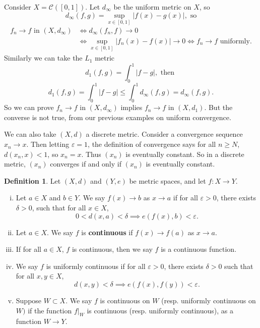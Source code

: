 \documentclass[12pt]{article}
\theoremstyle{definition}
\newtheorem{definition}{Definition}[section]
\theoremstyle{remark}
\begin{document}
\begin{adjustbox}{minipage = \columnwidth - 25.5pt, margin=1em, frame=1pt, margin=0em}
	Consider $X = \mathcal{C}([0, 1])$. Let $d_{\infty}$ be the uniform metric on $X$, so
	\[
		d_{\infty}(f, g) = \sup_{x\in[0,1]}|f(x) - g(x)|, \text{ so}
	\]
	\begin{align*}
		f_n \to f \text{ in } (X, d_{\infty}) &\iff d_{\infty}(f_n, f) \to 0 \\
						      &\iff \sup_{x \in [0, 1]}|f_n(x) - f(x)| \to 0 \iff f_n \to f \text{ uniformly}.
	\end{align*}
	Similarly we can take the $L_1$ metric
	\[
		d_1(f, g) = \int_{0}^{1}|f - g|, \text{ then }
	\]
	\[
		d_1(f, g) = \int_{0}^{1}|f - g| \leq \int_{0}^{1}d_{\infty}(f, g) = d_{\infty}(f, g)
	.\]
	So we can prove $f_n \to f$ in $(X, d_{\infty})$ implies $f_n \to f$ in $(X, d_1)$. But the converse is not true, from our previous examples on uniform convergence.

	We can also take $(X, d)$ a discrete metric. Consider a convergence sequence $x_n \to x$. Then letting $\varepsilon = 1$, the definition of convergence says for all $n \geq N$, $d(x_n, x) < 1$, so $x_n = x$. Thus $(x_n)$ is eventually constant. So in a discrete metric, $(x_n)$ converges if and only if $(x_n)$ is eventually constant.
\end{adjustbox}

\begin{definition}
	Let $(X, d)$ and $(Y, e)$ be metric spaces, and let $f:X \to Y$.
	\begin{enumerate}[(i)]
		\item Let $a \in X$ and $b \in Y$. We say $f(x) \to b$ as $x \to a$ if for all $\varepsilon > 0$, there exists $\delta > 0$, such that for all $x \in X$,
			\[
				0 < d(x, a) < \delta \implies e(f(x), b) < \varepsilon
			.\]
		\item Let $a \in X$. We say $f$ is \textbf{continuous} if $f(x) \to f(a)$ as $x \to a$.
		\item If for all $a \in X$, $f$ is continuous, then we say $f$ is a continuous function.
		\item We say $f$ is uniformly continuous if for all $\varepsilon > 0$, there exists $\delta > 0$ such that for all $x, y \in X$,
			\[
				d(x, y) < \delta \implies e(f(x), f(y)) < \varepsilon
			.\]
		\item Suppose $W \subset X$. We say $f$ is continuous on $W$ (resp. uniformly continuous on $W)$ if the function $f|_{W}$ is continuous (resp. uniformly continuous), as a function $W \to Y$.
	\end{enumerate}
	
\end{definition}
\end{document}
